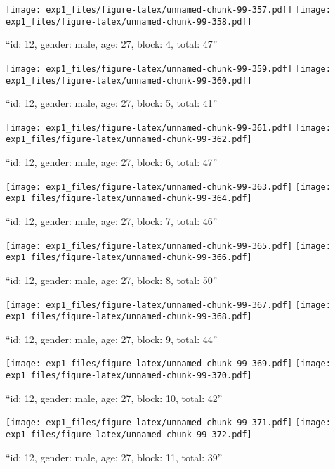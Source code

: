 \documentclass[,]{article}
\begin{document}
\texttt{[image: exp1\_files/figure-latex/unnamed-chunk-99-357.pdf]}
\texttt{[image: exp1\_files/figure-latex/unnamed-chunk-99-358.pdf]}

\newpage
[1] 

``id: 12, gender: male, age: 27, block: 4, total: 47''

\texttt{[image: exp1\_files/figure-latex/unnamed-chunk-99-359.pdf]}
\texttt{[image: exp1\_files/figure-latex/unnamed-chunk-99-360.pdf]}

\newpage
[1] 

``id: 12, gender: male, age: 27, block: 5, total: 41''

\texttt{[image: exp1\_files/figure-latex/unnamed-chunk-99-361.pdf]}
\texttt{[image: exp1\_files/figure-latex/unnamed-chunk-99-362.pdf]}

\newpage
[1] 

``id: 12, gender: male, age: 27, block: 6, total: 47''

\texttt{[image: exp1\_files/figure-latex/unnamed-chunk-99-363.pdf]}
\texttt{[image: exp1\_files/figure-latex/unnamed-chunk-99-364.pdf]}

\newpage
[1] 

``id: 12, gender: male, age: 27, block: 7, total: 46''

\texttt{[image: exp1\_files/figure-latex/unnamed-chunk-99-365.pdf]}
\texttt{[image: exp1\_files/figure-latex/unnamed-chunk-99-366.pdf]}

\newpage
[1] 

``id: 12, gender: male, age: 27, block: 8, total: 50''

\texttt{[image: exp1\_files/figure-latex/unnamed-chunk-99-367.pdf]}
\texttt{[image: exp1\_files/figure-latex/unnamed-chunk-99-368.pdf]}

\newpage
[1] 

``id: 12, gender: male, age: 27, block: 9, total: 44''

\texttt{[image: exp1\_files/figure-latex/unnamed-chunk-99-369.pdf]}
\texttt{[image: exp1\_files/figure-latex/unnamed-chunk-99-370.pdf]}

\newpage
[1] 

``id: 12, gender: male, age: 27, block: 10, total: 42''

\texttt{[image: exp1\_files/figure-latex/unnamed-chunk-99-371.pdf]}
\texttt{[image: exp1\_files/figure-latex/unnamed-chunk-99-372.pdf]}

\newpage
[1] 

``id: 12, gender: male, age: 27, block: 11, total: 39''
\end{document}
